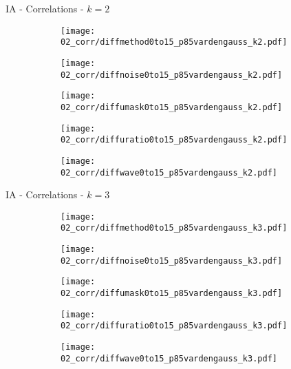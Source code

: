 \documentclass{beamer}
\begin{document}
\begin{frame}{IA - Correlations - $k=2$}{}
\begin{figure}
\centering
\begin{subfigure}{0.19\textwidth}
\texttt{[image: 02\_corr/diffmethod0to15\_p85vardengauss\_k2.pdf]}
\end{subfigure}
\begin{subfigure}{0.19\textwidth}
\texttt{[image: 02\_corr/diffnoise0to15\_p85vardengauss\_k2.pdf]}
\end{subfigure}
\begin{subfigure}{0.19\textwidth}
\texttt{[image: 02\_corr/diffumask0to15\_p85vardengauss\_k2.pdf]}
\end{subfigure}
\begin{subfigure}{0.19\textwidth}
\texttt{[image: 02\_corr/diffuratio0to15\_p85vardengauss\_k2.pdf]}
\end{subfigure}
\begin{subfigure}{0.19\textwidth}
\texttt{[image: 02\_corr/diffwave0to15\_p85vardengauss\_k2.pdf]}
\end{subfigure}
\end{figure}
\end{frame}

\begin{frame}{IA - Correlations - $k=3$}{}
\begin{figure}
\centering
\begin{subfigure}{0.19\textwidth}
\texttt{[image: 02\_corr/diffmethod0to15\_p85vardengauss\_k3.pdf]}
\end{subfigure}
\begin{subfigure}{0.19\textwidth}
\texttt{[image: 02\_corr/diffnoise0to15\_p85vardengauss\_k3.pdf]}
\end{subfigure}
\begin{subfigure}{0.19\textwidth}
\texttt{[image: 02\_corr/diffumask0to15\_p85vardengauss\_k3.pdf]}
\end{subfigure}
\begin{subfigure}{0.19\textwidth}
\texttt{[image: 02\_corr/diffuratio0to15\_p85vardengauss\_k3.pdf]}
\end{subfigure}
\begin{subfigure}{0.19\textwidth}
\texttt{[image: 02\_corr/diffwave0to15\_p85vardengauss\_k3.pdf]}
\end{subfigure}
\end{figure}
\end{frame}
\end{document}
